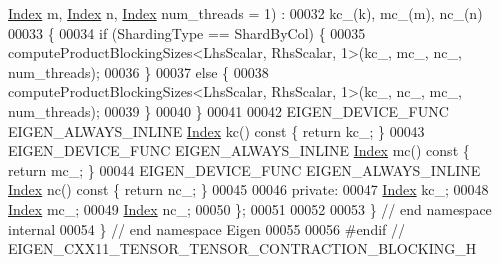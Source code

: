 \begin{DoxyCode}
      \hyperlink{namespace_eigen_a62e77e0933482dafde8fe197d9a2cfde}{Index} m, \hyperlink{namespace_eigen_a62e77e0933482dafde8fe197d9a2cfde}{Index} n, \hyperlink{namespace_eigen_a62e77e0933482dafde8fe197d9a2cfde}{Index} num\_threads = 1) :
00032       kc\_(k), mc\_(m), nc\_(n)
00033   \{
00034     \textcolor{keywordflow}{if} (ShardingType == ShardByCol) \{
00035       computeProductBlockingSizes<LhsScalar, RhsScalar, 1>(kc\_, mc\_, nc\_, num\_threads);
00036     \}
00037     \textcolor{keywordflow}{else} \{
00038       computeProductBlockingSizes<LhsScalar, RhsScalar, 1>(kc\_, nc\_, mc\_, num\_threads);
00039     \}
00040   \}
00041 
00042   EIGEN\_DEVICE\_FUNC EIGEN\_ALWAYS\_INLINE \hyperlink{namespace_eigen_a62e77e0933482dafde8fe197d9a2cfde}{Index} kc()\textcolor{keyword}{ const }\{ \textcolor{keywordflow}{return} kc\_; \}
00043   EIGEN\_DEVICE\_FUNC EIGEN\_ALWAYS\_INLINE \hyperlink{namespace_eigen_a62e77e0933482dafde8fe197d9a2cfde}{Index} mc()\textcolor{keyword}{ const }\{ \textcolor{keywordflow}{return} mc\_; \}
00044   EIGEN\_DEVICE\_FUNC EIGEN\_ALWAYS\_INLINE \hyperlink{namespace_eigen_a62e77e0933482dafde8fe197d9a2cfde}{Index} nc()\textcolor{keyword}{ const }\{ \textcolor{keywordflow}{return} nc\_; \}
00045 
00046  \textcolor{keyword}{private}:
00047   \hyperlink{namespace_eigen_a62e77e0933482dafde8fe197d9a2cfde}{Index} kc\_;
00048   \hyperlink{namespace_eigen_a62e77e0933482dafde8fe197d9a2cfde}{Index} mc\_;
00049   \hyperlink{namespace_eigen_a62e77e0933482dafde8fe197d9a2cfde}{Index} nc\_;
00050 \};
00051 
00052 
00053 \} \textcolor{comment}{// end namespace internal}
00054 \} \textcolor{comment}{// end namespace Eigen}
00055 
00056 \textcolor{preprocessor}{#endif // EIGEN\_CXX11\_TENSOR\_TENSOR\_CONTRACTION\_BLOCKING\_H}
\end{DoxyCode}
